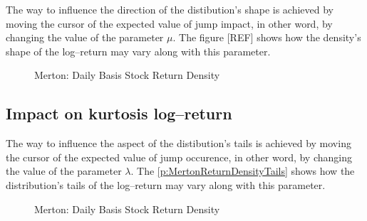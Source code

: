 \documentclass[12pt]{report}
\begin{document}
The way to influence the direction of the distibution's shape is achieved by moving the cursor of the expected value of jump impact, in other word, by changing the value of the parameter $\mu$. The figure [REF] shows how the density's shape of the log--return may vary along with this parameter.


\begin{figure}[H]
\centering

\caption{Merton: Daily Basis Stock Return Density}
\label{plot:MertonReturnDensity}
\end{figure}

\subsection{Impact on kurtosis log--return}
\label{sub:MertonKurtosis}

The way to influence the aspect of the distibution's tails is achieved by moving the cursor of the expected value of jump occurence, in other word, by changing the value of the parameter $\lambda$. The \cref{p:MertonReturnDensityTails} shows how the distribution's tails of the log--return may vary along with this parameter.

\begin{figure}[H]
\centering

\caption{Merton: Daily Basis Stock Return Density}
\label{plot:MertonReturnDensityTails}
\end{figure}
\end{document}
